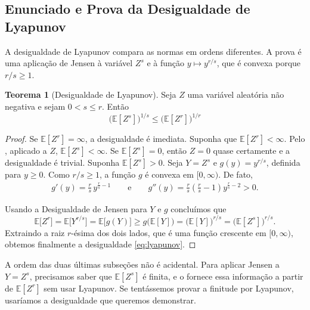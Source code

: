 \documentclass[12pt,portuguese]{article}
\theoremstyle{definition}
\newtheorem{theorem}{Teorema}
\theoremstyle{plainexercise}
\theoremstyle{starredexercise}
\theoremstyle{definition}
\begin{document}
\subsection{Enunciado e Prova da Desigualdade de Lyapunov}\label{subsec:lyapunov}

A desigualdade de Lyapunov compara as normas em ordens diferentes. A prova é
uma aplicação de Jensen à variável $Z^s$ e à função $y\longmapsto y^{r/s}$, que é
convexa porque $r/s\geqslant1$.

\begin{theorem}[Desigualdade de Lyapunov]\label{thm:lyapunov}
Seja $Z$ uma variável aleatória não negativa e sejam $0<s\leqslant r$. Então
\begin{equation}\label{eq:lyapunov}
\bigl(\mathbb{E}[Z^s]\bigr)^{1/s}
\leqslant 
\bigl(\mathbb{E}[Z^r]\bigr)^{1/r}
\end{equation}
\end{theorem}

\begin{proof}
Se $\mathbb{E}[Z^r]=\infty$, a desigualdade é imediata. Suponha que
$\mathbb{E}[Z^r]<\infty$. Pelo , aplicado a $Z$,
$\mathbb{E}[Z^s]<\infty$. Se $\mathbb{E}[Z^s]=0$, então $Z=0$ quase certamente
e a desigualdade é trivial. Suponha $\mathbb{E}[Z^s]>0$. Seja $Y=Z^s$ e
$g(y)=y^{r/s}$, definida para
$y\geqslant0$. Como $r/s\geqslant1$, a função $g$ é convexa em $[0,\infty)$.
De fato,
\begin{align*}
g'(y) = \frac{r}{s}\, y^{ \frac{r}{s} - 1 }
\qquad \text{e} \qquad 
g''(y) = \frac{r}{s} \left( \frac{r}{s}-1 \right) y^{ \frac{r}{s} - 2 }>0. 
\end{align*}

Usando a Desigualdade de Jensen para $Y$ e $g$ concluímos que
\[
\mathbb{E}\bigl[Z^r\bigr]
=
\mathbb{E}\bigl[Y^{r/s}\bigr]
=
\mathbb{E}\bigl[g(Y)\bigr]
\geqslant
g\bigl(\mathbb{E}[Y]\bigr)
=
\bigl(\mathbb{E}[Y]\bigr)^{r/s}
=
\bigl(\mathbb{E}[Z^s]\bigr)^{r/s}.
\]
Extraindo a raiz $r$-ésima dos dois lados, que é uma função crescente em
$[0,\infty)$, obtemos finalmente a desigualdade \eqref{eq:lyapunov}.
\end{proof}

A ordem das duas últimas subseções não é acidental. Para aplicar Jensen a
$Y=Z^s$, precisamos saber que $\mathbb{E}[Z^s]$ é finita, e o
 fornece essa informação a partir de $\mathbb{E}[Z^r]$ sem
usar Lyapunov. Se tentássemos provar a finitude por Lyapunov, usaríamos a
desigualdade que queremos demonstrar.
\end{document}
